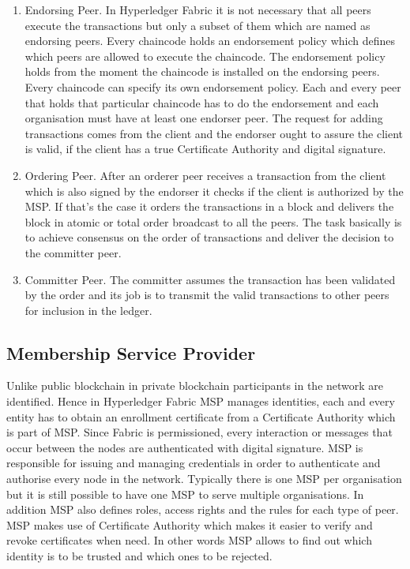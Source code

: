\begin{enumerate}
\item Endorsing Peer. In Hyperledger Fabric it is not necessary that all peers execute the transactions but only a subset of them which are named as endorsing peers. Every chaincode holds an endorsement policy which defines which peers are allowed to execute the chaincode. The endorsement policy holds from the moment the chaincode is installed on the endorsing peers. Every chaincode can specify its own endorsement policy. Each and every peer that holds that particular chaincode has to do the endorsement and each organisation must have at least one endorser peer. The request for adding transactions comes from the client and the endorser ought to assure the client is valid, if the client has a true Certificate Authority and digital signature. 


\item Ordering Peer. 
After an orderer peer receives a transaction from the client which is also signed by the endorser it checks if the client is authorized by the MSP. If that's the case it orders the transactions in a block and delivers the block in atomic or total order broadcast to all the peers. The task basically is to achieve consensus on the order of transactions and deliver the decision to the committer peer. 
\item Committer Peer. The committer assumes the transaction has been validated by the order and its job is to transmit the valid transactions to other peers for inclusion in the ledger. 
\end{enumerate}



\subsection{Membership Service Provider}
Unlike public blockchain in private blockchain participants in the network are identified. Hence in Hyperledger Fabric 
MSP manages identities, each  and every entity has to obtain an enrollment certificate from a Certificate Authority which is part of MSP. Since Fabric is permissioned, every interaction or messages that occur between the nodes are authenticated with digital signature. MSP is responsible for issuing and managing credentials in order to authenticate and authorise every node in the network. Typically there is one MSP per organisation but it is still possible to have one MSP to serve multiple organisations. In addition MSP also defines roles, access rights and the rules for each type of peer. MSP makes use of Certificate Authority which makes it easier to verify and revoke certificates when need. In other words MSP allows to find out which identity is to be trusted and which ones to be rejected. 


